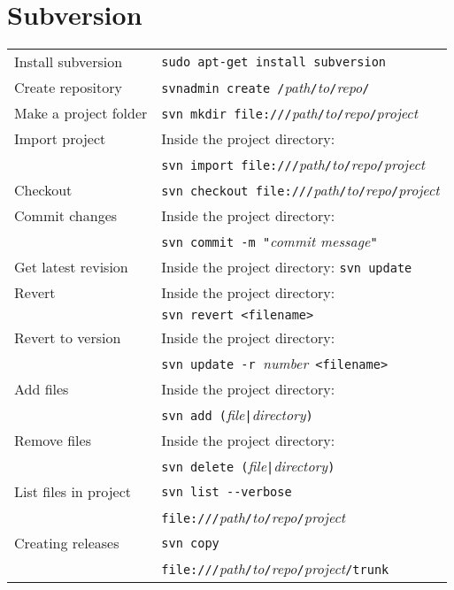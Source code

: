 \section{Subversion}
\settowidth{\MyLen}{List files in project~~}
\begin{tabular}{@{}p{\the\MyLen}%
				@{}p{\linewidth-\the\MyLen}}
	Install subversion			& \verb!sudo apt-get install subversion! \\
	Create repository			& \verb!svnadmin create /!\textit{path}\verb!/!\textit{to}\verb!/!\textit{repo}\verb!/!\\
	Make a project folder		& \verb!svn mkdir file:///!\textit{path}\verb!/!\textit{to}\verb!/!\textit{repo}\verb!/!\textit{project} \\
	Import project				& Inside the project directory:\\
								& \verb!svn import file:///!\textit{path}\verb!/!\textit{to}\verb!/!\textit{repo}\verb!/!\textit{project} \\
	Checkout					& \verb!svn checkout file:///!\textit{path}\verb!/!\textit{to}\verb!/!\textit{repo}\verb!/!\textit{project}\\
	Commit changes				& Inside the project directory:\\ 
								& \verb!svn commit -m "!\textit{commit message}\verb!"!\\
	Get latest revision			& Inside the project directory: \verb!svn update!\\
	Revert						& Inside the project directory: \\
								&\verb!svn revert <filename>!\\
	Revert to version			& Inside the project directory: \\
								& \verb!svn update -r !\textit{number}~\verb!<filename>!\\
	Add files 					& Inside the project directory:\\
								& \verb!svn add (!\textit{file}\verb!|!\textit{directory}\verb!)!\\
	Remove files				& Inside the project directory:\\
								& \verb!svn delete (!\textit{file}\verb!|!\textit{directory}\verb!)!\\
	List files in project		& \verb!svn list --verbose!\\
								& \verb!file:///!\textit{path}\verb!/!\textit{to}\verb!/!\textit{repo}\verb!/!\textit{project}\\
	Creating releases			& \verb!svn copy !\\
								& \verb!file:///!\textit{path}\verb!/!\textit{to}\verb!/!\textit{repo}\verb!/!\textit{project}\verb!/trunk! \\

\end{tabular}
